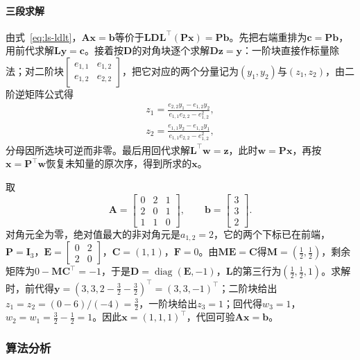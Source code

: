 \paragraph{三段求解}
由式~\eqref{eq:ls-ldlt}，$\bm A\bm x=\bm b$等价于$\bm L\bm D\bm L^\top(\bm P\bm x)=\bm P\bm b$。先把右端重排为$\bm c=\bm P\bm b$，用前代求解$\bm L\bm y=\bm c$。接着按$\bm D$的对角块逐个求解$\bm D\bm z=\bm y$：一阶块直接作标量除法；对二阶块$\left[\begin{smallmatrix}e_{1,1}&e_{1,2}\\e_{1,2}&e_{2,2}\end{smallmatrix}\right]$，把它对应的两个分量记为$(y_1,y_2)$与$(z_1,z_2)$，由二阶逆矩阵公式得
\[
\begin{gathered}
 z_1=\frac{e_{2,2}y_1-e_{1,2}y_2}{e_{1,1}e_{2,2}-e_{1,2}^2},\\
 z_2=\frac{e_{1,1}y_2-e_{1,2}y_1}{e_{1,1}e_{2,2}-e_{1,2}^2},
\end{gathered}
\]
分母因所选块可逆而非零。最后用回代求解$\bm L^\top\bm w=\bm z$，此时$\bm w=\bm P\bm x$，再按$\bm x=\bm P^\top\bm w$恢复未知量的原次序，得到所求的$\bm x$。

\begin{example}[需要二阶块的LDL分解]
\label{ex:ls-ldlt-two-by-two}
取
\[
 \bm A=\begin{bmatrix}0&2&1\\2&0&1\\1&1&0\end{bmatrix},\qquad
 \bm b=\begin{bmatrix}3\\3\\2\end{bmatrix}.
\]
对角元全为零，绝对值最大的非对角元是$a_{1,2}=2$，它的两个下标已在前端，$\bm P=\bm I_3$，$\bm E=\left[\begin{smallmatrix}0&2\\2&0\end{smallmatrix}\right]$，$\bm C=(1,1)$，$\bm F=0$。由$\bm M\bm E=\bm C$得$\bm M=(\tfrac12,\tfrac12)$，剩余矩阵为$0-\bm M\bm C^\top=-1$，于是$\bm D=\operatorname{diag}(\bm E,-1)$，$\bm L$的第三行为$(\tfrac12,\tfrac12,1)$。求解时，前代得$\bm y=(3,3,2-\tfrac32-\tfrac32)^\top=(3,3,-1)^\top$；二阶块给出$z_1=z_2=(0-6)/(-4)=\tfrac32$，一阶块给出$z_3=1$；回代得$w_3=1$，$w_2=w_1=\tfrac32-\tfrac12=1$。因此$\bm x=(1,1,1)^\top$，代回可验$\bm A\bm x=\bm b$。
\end{example}

\subsubsection{算法分析}
